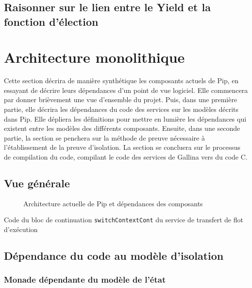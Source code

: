		\subsection{Raisonner sur le lien entre le Yield et la fonction d'élection}
	

	\section{Architecture monolithique}

		Cette section décrira de manière synthétique les composants actuels de Pip, en essayant de décrire leurs dépendances d'un point de vue logiciel. Elle commencera par donner brièvement une vue d'ensemble du projet. Puis, dans une première partie, elle décrira les dépendances du code des services sur les modèles décrits dans Pip. Elle dépliera les définitions pour mettre en lumière les dépendances qui existent entre les modèles des différents composants. Ensuite, dans une seconde partie, la section se penchera sur la méthode de preuve nécessaire à l'établissement de la preuve d'isolation. La section se concluera sur le processus de compilation du code, compilant le code des services de Gallina vers du code C.
		
		\subsection{Vue générale}

			\begin{figure}[!ht]
				
				\caption{Architecture actuelle de Pip et dépendances des composants}
				\label{fig:currentPipArchitecture}
			\end{figure}
			\begin{listing}[!ht]
				\caption{Code du bloc de continuation \texttt{switchContextCont} du service de transfert de flot d'exécution}
				\label{code:switchContextCont}
			\end{listing}

		\subsection{Dépendance du code au modèle d'isolation}

			\subsubsection{Monade dépendante du modèle de l'état}

